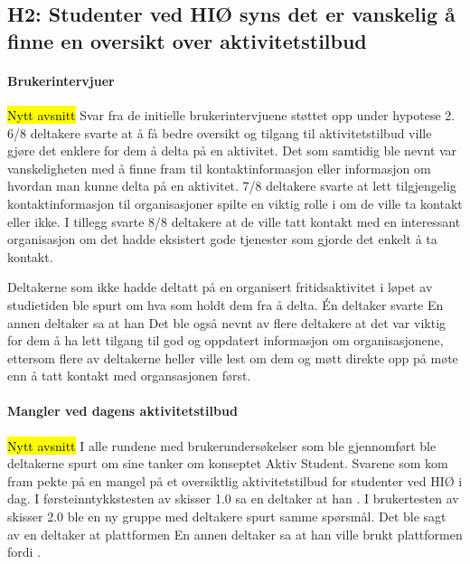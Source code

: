 \subsection{H2: Studenter ved HIØ syns det er vanskelig å finne en oversikt over aktivitetstilbud}

\paragraph{Brukerintervjuer}
\hl{Nytt avsnitt}
Svar fra de initielle brukerintervjuene støttet opp under hypotese 2. 6/8 deltakere svarte at å få bedre oversikt og tilgang til aktivitetstilbud ville gjøre det enklere for dem å delta på en aktivitet. Det som samtidig ble nevnt var vanskeligheten med å finne fram til kontaktinformasjon eller informasjon om hvordan man kunne delta på en aktivitet. 7/8 deltakere svarte at lett tilgjengelig kontaktinformasjon til organisasjoner spilte en viktig rolle i om de ville ta kontakt eller ikke. I tillegg svarte 8/8 deltakere at de ville tatt kontakt med en interessant organisasjon om det hadde eksistert gode tjenester som gjorde det enkelt å ta kontakt.

Deltakerne som ikke hadde deltatt på en organisert fritidsaktivitet i løpet av studietiden ble spurt om hva som holdt dem fra å delta. Én deltaker svarte  En annen deltaker sa at han  Det ble også nevnt av flere deltakere at det var viktig for dem å ha lett tilgang til god og oppdatert informasjon om organisasjonene, ettersom flere av deltakerne heller ville lest om dem og møtt direkte opp på møte enn å tatt kontakt med organsasjonen først.

\paragraph{Mangler ved dagens aktivitetstilbud}
\hl{Nytt avsnitt}
I alle rundene med brukerundersøkelser som ble gjennomført ble deltakerne spurt om sine tanker om konseptet Aktiv Student. Svarene som kom fram pekte på en mangel på et oversiktlig aktivitetstilbud for studenter ved HIØ i dag. I førsteinntykkstesten av skisser 1.0 sa en deltaker at han . I brukertesten av skisser 2.0 ble en ny gruppe med deltakere spurt samme spørsmål. Det ble sagt av en deltaker at plattformen  En annen deltaker sa at han ville brukt plattformen fordi .


